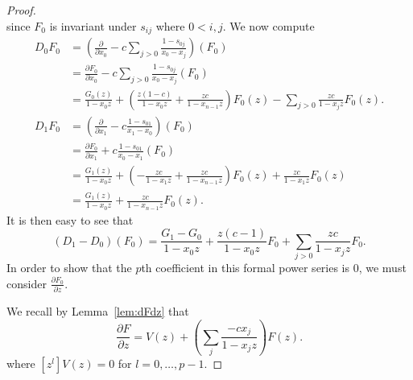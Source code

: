 \documentclass{amsart}
\numberwithin{equation}{section}
\theoremstyle{definition}
\begin{document}
\begin{proof}
\[\]
since $F_0$ is invariant under $s_{ij}$ where $0 < i,j$. We now compute
\begin{align*}
D_0F_0&=\left(\frac{\partial}{\partial x_0}-c\sum_{j > 0} \frac{1-s_{0j}}{x_0-x_j}\right)(F_0)\\
&=\frac{\partial F_0}{\partial x_0}-c\sum_{j > 0} \frac{1-s_{0j}}{x_0-x_j}(F_0)\\
&=\frac{G_0(z)}{1-x_0z}+\left(\frac{z(1-c)}{1-x_0z}+\frac{zc}{1-x_{n-1}z}\right)F_0(z)-\sum_{j > 0} \frac{zc}{1-x_jz}F_0(z).\\
D_1F_0&=\left(\frac{\partial}{\partial x_1}-c \frac{1-s_{01}}{x_1-x_0}\right)(F_0)\\
&=\frac{\partial F_0}{\partial x_1}+c \frac{1-s_{01}}{x_0-x_1}(F_0)\\
&=\frac{G_1(z)}{1-x_0z}+\left(-\frac{zc}{1-x_1z}+\frac{zc}{1-x_{n-1}z}\right)F_0(z)+\frac{zc}{1-x_1z}F_0(z)\\
&=\frac{G_1(z)}{1-x_0z}+\frac{zc}{1-x_{n-1}z}F_0(z).
\end{align*}
It is then easy to see that 
\[
(D_1-D_0)(F_0)=\frac{G_1-G_0}{1-x_0z}+\frac{z(c-1)}{1-x_0z}F_0+\sum_{j>0} \frac{zc}{1-x_jz}F_0.
\]
In order to show that the $p$th coefficient in this formal power series is $0$, we must consider $\frac{\partial F_0}{\partial z}$. 

We recall by Lemma~\ref{lem:dFdz} that
\[
\frac{\partial F}{\partial z}=V(z)+\left(\sum_j \frac{-cx_j}{1-x_jz}\right)F(z).
\]
where $[z^l]V(z)=0$ for $l=0,\dots,p-1$. 


\end{proof}
\end{document}
